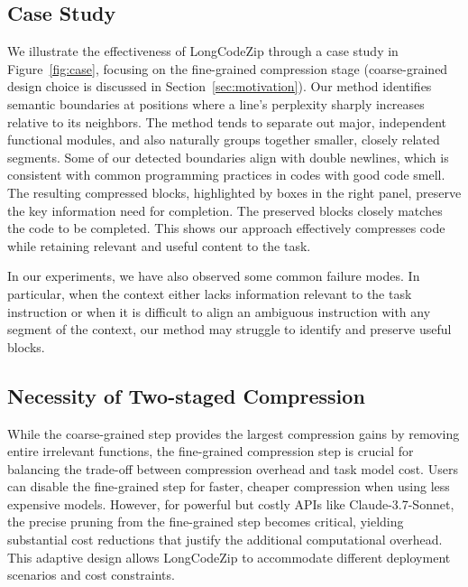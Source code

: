 \documentclass[10pt,conference]{IEEEtran}
\newcommand{\edit}[1]{{\color{black}#1}}
\newcommand{\todoc}[2]{{\textcolor{#1}{\textbf{[#2]}}}}
\newcommand{\shi}[1]{\todoc{orange}{Shi: #1}}
\newcommand{\approach}{{LongCodeZip}\xspace} %
\begin{document}

\subsection{Case Study}


We illustrate the effectiveness of \approach through a case study in Figure~\ref{fig:case}, focusing on the fine-grained compression stage (coarse-grained design choice is discussed in Section~\ref{sec:motivation}). Our method identifies semantic boundaries at positions where a line's perplexity sharply increases relative to its neighbors. The method tends to separate out major, independent functional modules, and also naturally groups together smaller, closely related segments. Some of our detected boundaries align with double newlines, which is consistent with common programming practices in codes with good code smell. %
The resulting compressed blocks, highlighted by boxes in the right panel, preserve the key information need for completion. The preserved blocks closely matches the code to be completed. This shows our approach effectively compresses code while retaining relevant and useful content to the task.

In our experiments, we have also observed some common failure modes.
In particular, when the context either lacks information relevant to the task instruction or when it is difficult to align an ambiguous instruction with any segment of the context, our method may struggle to identify and preserve useful blocks. 

\subsection{\edit{Necessity of Two-staged Compression}}
\edit{While the coarse-grained step provides the largest compression gains by removing entire irrelevant functions, the fine-grained compression step is crucial for balancing the trade-off between compression overhead and task model cost. Users can disable the fine-grained step for faster, cheaper compression when using less expensive models. However, for powerful but costly APIs like Claude-3.7-Sonnet, the precise pruning from the fine-grained step becomes critical, yielding substantial cost reductions that justify the additional computational overhead. This adaptive design allows \approach to accommodate different deployment scenarios and cost constraints.}
\end{document}
